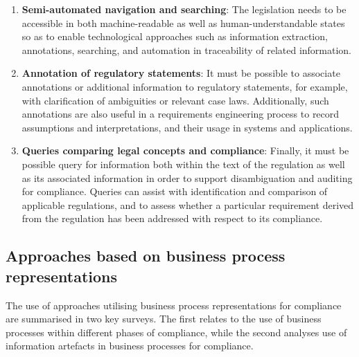 \begin{enumerate}[label={\textit{REO.\theenumi}}]
    \item \textbf{Semi-automated navigation and searching}: The legislation needs to be accessible in both machine-readable as well as human-understandable states so as to enable technological approaches such as information extraction, annotations, searching, and automation in traceability of related information.
    \item \textbf{Annotation of regulatory statements}: It must be possible to associate annotations or additional information to regulatory statements, for example, with clarification of ambiguities or relevant case laws. Additionally, such annotations are also useful in a requirements engineering process to record assumptions and interpretations, and their usage in systems and applications.
    \item \textbf{Queries comparing legal concepts and compliance}: Finally, it must be possible query for information both within the text of the regulation as well as its associated information in order to support disambiguation and auditing for compliance. 
    Queries can assist with identification and comparison of applicable regulations, and to assess whether a particular requirement derived from the regulation has been addressed with respect to its compliance.
\end{enumerate}


\subsection{Approaches based on business process representations}
The use of approaches utilising business process representations for compliance are summarised in two key surveys. The first \cite{fellmann_state---art_2014} relates to the use of business processes within different phases of compliance, while the second \cite{benyoucef_information_2015} analyses use of information artefacts in business processes for compliance.

